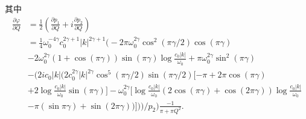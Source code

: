 其中
\newpage
    \begin{equation}
        \begin{aligned}
            \frac{\partial \varphi}{\partial Q} &= \frac{1}{2}(\frac{\partial p_1}{\partial
        Q}+i\frac{\partial p_2}{\partial Q}) \\
        &= \frac{1}{4}\omega_0^{-4\gamma}c_0^{2\gamma+1}|k|^{2\gamma+1}
         \Bigg(-2\pi\omega_0^{2\gamma}\cos^2(\pi\gamma/2)\cos(\pi\gamma)\\
         &-2\omega_0^{2\gamma}(1+\cos(\pi\gamma))\sin(\pi\gamma)\log\frac{c_0|k|}{\omega_0}
         +\pi\omega_0^{2\gamma}\sin^2(\pi\gamma) \\
         &-\bigg(2ic_0|k|\Big(2c_0^{2\gamma}|k|^{2\gamma}\cos^5(\pi\gamma/2)\sin(\pi\gamma/2)[-\pi
       + 2\pi\cos(\pi\gamma)\\
   &+2\log\frac{c_0|k|}{\omega_0}\sin(\pi\gamma)] -
       \omega_0^{2\gamma}[\log\frac{c_0|k|}{\omega_0} 
       (2\cos(\pi\gamma)+\cos(2\pi\gamma))\log\frac{c_0|k|}{\omega_0}\\
   &-\pi(\sin\pi\gamma)+\sin(2\pi\gamma))]
       \Big)\bigg)/p_2\Bigg)\frac{-1}{\pi+\pi Q^2}.
    \end{aligned}
    \end{equation}



